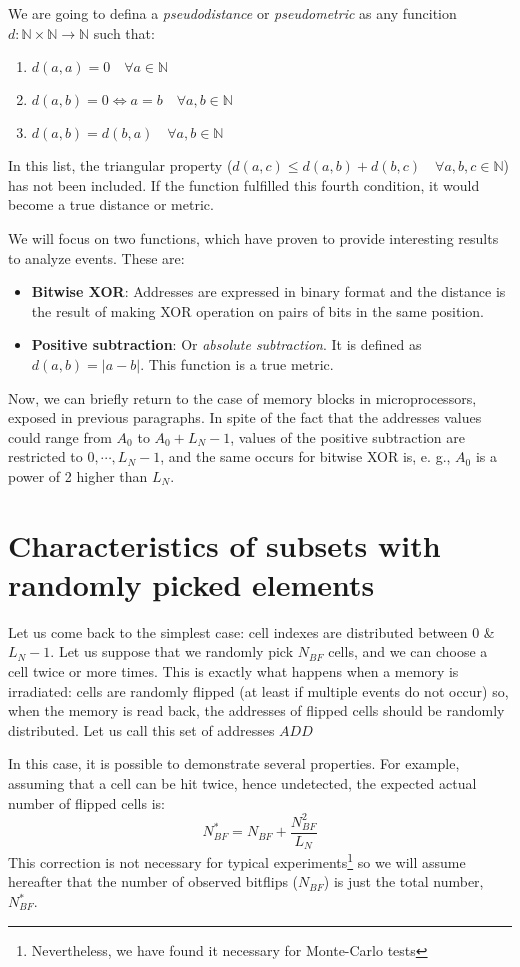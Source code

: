 We are going to defina a \textit{pseudodistance} or \textit{pseudometric} as any funcition \(d:\mathbb{N} \times \mathbb{N} \rightarrow \mathbb{N}\) such that:
%
\begin{enumerate}
	\item \(d(a, a) = 0\quad\forall a \in \mathbb{N}\)
	\item \(d(a, b) = 0\Leftrightarrow a = b \quad\forall a, b \in \mathbb{N}\)
	\item \(d(a, b) = d(b, a) \quad\forall a, b \in \mathbb{N}\)
\end{enumerate}
%
In this list, the triangular property (\(d(a,c) \le d(a, b)+d(b,c) \quad\forall a, b, c \in \mathbb{N}\)) has not been included. If the function fulfilled this fourth condition, it would become a true distance or metric.

We will focus on two functions, which have proven to provide interesting results to analyze events. These are:
%
\begin{itemize}
	\item \textbf{Bitwise XOR}: Addresses are expressed in binary format and the distance is the result of making XOR operation on pairs of bits in the same position.
	\item \textbf{Positive subtraction}:  Or \textit{absolute subtraction}. It is defined as \(d(a, b)=\left|a-b\right|\). This function is a true metric.
\end{itemize}
%
Now, we can briefly return to the case of memory blocks in microprocessors, exposed in previous paragraphs. In spite of the fact that the addresses values could range from \(A_0\) to \(A_0+L_N-1\), values of the positive subtraction are restricted to \(0,\cdots, L_N-1\), and the same occurs for bitwise XOR is, e. g., \(A_0\) is a power of 2 higher than \(L_N\).
%
\section{Characteristics of subsets with randomly picked elements}
%
Let us come back to the simplest case: cell indexes are distributed between \(0\) \& \(L_N-1\). Let us suppose that we randomly pick \(N_{BF}\) cells, and we can choose a cell twice or more times. This is exactly what happens when a memory is irradiated: cells are randomly flipped (at least if multiple events do not occur) so, when the memory is read back, the addresses of flipped cells should be randomly distributed. Let us call this set of addresses \(ADD\)

In this case, it is possible to demonstrate several properties. For example, assuming that a cell can be hit twice, hence undetected, the expected actual number of flipped cells is:
\begin{equation}
	N_{BF}^* = N_{BF}+\frac{N_{BF}^2}{L_N}
	\label{Eq:ActualNumberOfBF}
\end{equation}
This correction is not necessary for typical experiments\footnote{Nevertheless, we have found it necessary for Monte-Carlo tests} so we will assume hereafter that the number of observed bitflips (\(N_{BF}\)) is just the total number, \(N_{BF}^*\). 

